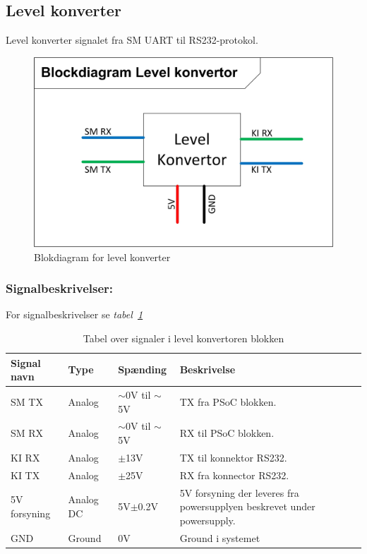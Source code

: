\subsection{Level konverter}
Level konverter signalet fra SM UART til RS232-protokol.
\begin{figure}[H]
\centering
\includegraphics[scale=1]{billeder/Level_konverter}
\caption{Blokdiagram for level konverter}
\label{fig:LevelKonverter}
\end{figure}
\subsubsection{Signalbeskrivelser:}
For signalbeskrivelser se \textit{tabel~\ref{table:SignalerLevelKonverter}}
\begin{table}[H]
\begin{tabular}{|p{3cm}|p{3cm}|p{3cm}|p{4.5cm}|} \hline
\cellcolor[gray]{0.85}Signal navn& \cellcolor[gray]{0.85}Type &\cellcolor[gray]{0.85}Spænding&\cellcolor[gray]{0.85}Beskrivelse\\ \hline
SM TX & Analog & $\sim$0V til $\sim$5V & TX fra PSoC blokken.\\ \hline
SM RX & Analog & $\sim$0V til $\sim$5V & RX til PSoC blokken. \\ \hline
KI RX & Analog & $\pm$13V & TX til konnektor RS232.\\ \hline
KI TX & Analog & $\pm$25V & RX fra konnector RS232. \\ \hline
5V forsyning & Analog DC & 5V$\pm$0.2V & 5V forsyning der leveres fra powersupplyen beskrevet under powersupply.\\ \hline
GND & Ground & 0V & Ground i systemet \\ \hline
\end{tabular}
\caption{Tabel over signaler i level konvertoren blokken}
\label{table:SignalerLevelKonverter}
\end{table}
\newpage

